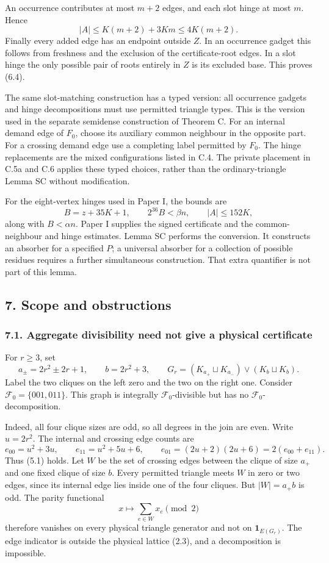 \documentclass[english,11pt,a4paper]{article}
\begin{document}
An occurrence contributes at most \(m+2\) edges, and each slot hinge at most \(m\). Hence \[|A|\le K(m+2)+3Km\le4K(m+2).\] Finally every added edge has an endpoint outside \(Z\). In an occurrence gadget this follows from freshness and the exclusion of the certificate-root edges. In a slot hinge the only possible pair of roots entirely in \(Z\) is its excluded base. This proves (6.4).

The same slot-matching construction has a typed version: all occurrence gadgets and hinge decompositions must use permitted triangle types. This is the version used in the separate semidense construction of Theorem C. For an internal demand edge of \(F_0\), choose its auxiliary common neighbour in the opposite part. For a crossing demand edge use a completing label permitted by \(F_0\). The hinge replacements are the mixed configurations listed in C.4. The private placement in C.5a and C.6 applies these typed choices, rather than the ordinary-triangle Lemma SC without modification.

For the eight-vertex hinges used in Paper I, the bounds are \[B=z+35K+1,\qquad 2^{36}B<\beta n,\qquad |A|\le152K,
\tag{6.7}\] along with \(B<\alpha n\). Paper I supplies the signed certificate and the common-neighbour and hinge estimates. Lemma SC performs the conversion. It constructs an absorber for a specified \(P\); a universal absorber for a collection of possible residues requires a further simultaneous construction. That extra quantifier is not part of this lemma.

\subsection{7. Scope and obstructions}\label{scope-and-obstructions}

\subsubsection{7.1. Aggregate divisibility need not give a physical certificate}\label{aggregate-divisibility-need-not-give-a-physical-certificate}

For \(r\ge3\), set \[a_\pm=2r^2\pm2r+1,\qquad b=2r^2+3,
\qquad G_r=(K_{a_+}\sqcup K_{a_-})\vee(K_b\sqcup K_b).
\tag{7.1}\] Label the two cliques on the left zero and the two on the right one. Consider \(\mathcal F_0=\{001,011\}\). This graph is integrally \(\mathcal F_0\)-divisible but has no \(\mathcal F_0\)-decomposition.

Indeed, all four clique sizes are odd, so all degrees in the join are even. Write \(u=2r^2\). The internal and crossing edge counts are \[e_{00}=u^2+3u,\qquad e_{11}=u^2+5u+6,
\qquad e_{01}=(2u+2)(2u+6)=2(e_{00}+e_{11}).
\tag{7.2}\] Thus (5.1) holds. Let \(W\) be the set of crossing edges between the clique of size \(a_+\) and one fixed clique of size \(b\). Every permitted triangle meets \(W\) in zero or two edges, since its internal edge lies inside one of the four cliques. But \(|W|=a_+b\) is odd. The parity functional \[x\longmapsto\sum_{e\in W}x_e\pmod2
\tag{7.3}\] therefore vanishes on every physical triangle generator and not on \(\mathbf1_{E(G_r)}\). The edge indicator is outside the physical lattice (2.3), and a decomposition is impossible.
\end{document}
